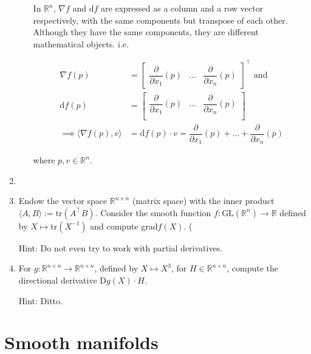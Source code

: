 \documentclass{article}
\begin{document}
\begin{enumerate}[start=9]
\begin{enumerate}
\begin{ans_box}
    In $\mathbb{R}^n$, $\nabla f$ and $\text{d}f$ are expressed as a column and a row vector respectively, with the same components but transpose of each other. Although they have the same components, they are different mathematical objects. i.e.

    \begin{equation*}
      \begin{split}
        \nabla f(p)&=
        \begin{bmatrix}
          \dfrac{\partial}{\partial x_{1}}(p)&\hdots&\dfrac{\partial}{\partial x_{n}}(p)
        \end{bmatrix}^{\top}\text{ and}\\
        \text{d}f(p)&=
        \begin{bmatrix}
          \dfrac{\partial}{\partial x_{1}}(p)&\hdots&\dfrac{\partial}{\partial x_{n}}(p)\\
        \end{bmatrix}\\
        \implies\langle\nabla f(p), v\rangle&=\text{d}f(p)\cdot v=\dfrac{\partial}{\partial x_{1}}(p)+\hdots+\dfrac{\partial}{\partial x_{n}}(p)
      \end{split}
    \end{equation*}

    where $p,v\in\mathbb{R}^{n}$.
    \end{ans_box}
  \end{enumerate}

  \item

  \item Endow the vector space $\mathbb{R}^{n\times n}$ (matrix space) with the inner product $\langle A,B\rangle:=\text{tr}(A^{\top}B)$. Consider the smooth function $f:\text{GL}(\mathbb{R}^{n})\rightarrow\mathbb{R}$ defined by $X\mapsto\text{tr}(X^{-1})$ and compute grad$f(X)$. (

  {\footnotesize Hint: Do not even try to work with partial derivatives.}

  \item For $g:\mathbb{R}^{n\times n}\rightarrow\mathbb{R}^{n\times n}$, defined by $X\mapsto X^{3}$, for $H\in\mathbb{R}^{n\times n}$, compute the directional derivative D$g(X)\cdot H$.

  {\footnotesize Hint: Ditto.}
\end{enumerate}

\section{Smooth manifolds}
\end{document}
